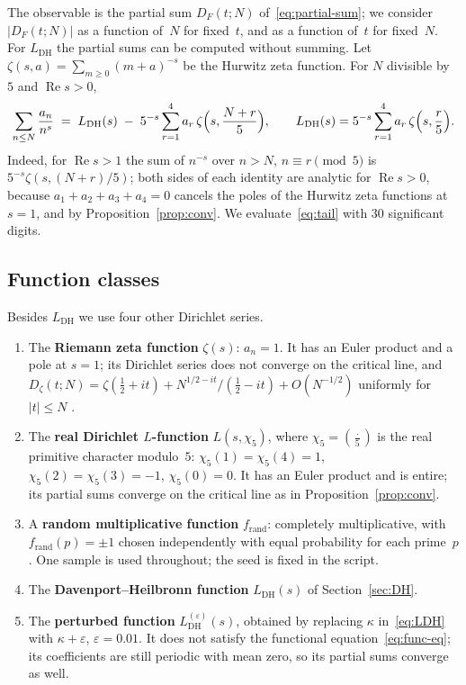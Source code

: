 \documentclass[11pt]{amsart}
\theoremstyle{definition}
\theoremstyle{remark}
\renewcommand{\DH}{\mathrm{DH}}
\newcommand{\abs}[1]{\lvert #1 \rvert}
\newcommand{\re}{\operatorname{Re}}
\begin{document}
The observable is the partial sum $D_F(t;N)$ of~\eqref{eq:partial-sum}; we
consider $\abs{D_F(t;N)}$ as a function of~$N$ for fixed~$t$, and as a
function of~$t$ for fixed~$N$.  For $L_{\DH}$ the partial sums can be
computed without summing.  Let $\zeta(s,a)=\sum_{m\ge0}(m+a)^{-s}$ be the
Hurwitz zeta function.  For $N$ divisible by~$5$ and $\re s>0$,
\begin{equation}\label{eq:tail}
  \sum_{n\le N}\frac{a_n}{n^{s}}
  \;=\; L_{\DH}(s)\;-\;5^{-s}\sum_{r=1}^{4}a_r\,
  \zeta\Bigl(s,\frac{N+r}{5}\Bigr),
  \qquad
  L_{\DH}(s)=5^{-s}\sum_{r=1}^{4}a_r\,\zeta\Bigl(s,\frac r5\Bigr).
\end{equation}
Indeed, for $\re s>1$ the sum of $n^{-s}$ over $n>N$, $n\equiv r\pmod5$
is $5^{-s}\zeta(s,(N+r)/5)$; both sides of each identity are analytic for
$\re s>0$, because $a_1+a_2+a_3+a_4=0$ cancels the poles of the Hurwitz
zeta functions at $s=1$, and by Proposition~\ref{prop:conv}.  We
evaluate~\eqref{eq:tail} with $30$ significant digits.

\subsection{Function classes}

Besides $L_{\DH}$ we use four other Dirichlet series.

\begin{enumerate}
\item The \textbf{Riemann zeta function} $\zeta(s)$: $a_n = 1$.  It has an
  Euler product and a pole at $s=1$; its Dirichlet series does not
  converge on the critical line, and
  $D_\zeta(t;N)=\zeta(\tfrac12+it)+N^{1/2-it}/(\tfrac12-it)+O(N^{-1/2})$
  uniformly for $\abs t\le N$ \cite[Theorem~4.11]{Titchmarsh1986}.

\item The \textbf{real Dirichlet $L$-function} $L(s, \chi_5)$, where
  $\chi_5=(\tfrac{\cdot}{5})$ is the real primitive character modulo~$5$:
  $\chi_5(1) = \chi_5(4) = 1$, $\chi_5(2) = \chi_5(3) = -1$,
  $\chi_5(0) = 0$.  It has an Euler product and is entire; its partial
  sums converge on the critical line as in Proposition~\ref{prop:conv}.

\item A \textbf{random multiplicative function} $f_{\mathrm{rand}}$:
  completely multiplicative, with $f_{\mathrm{rand}}(p)=\pm1$ chosen
  independently with equal probability for each prime~$p$.  One sample is
  used throughout; the seed is fixed in the script.

\item The \textbf{Davenport--Heilbronn function} $L_{\DH}(s)$ of
  Section~\ref{sec:DH}.

\item The \textbf{perturbed function} $L_{\DH}^{(\varepsilon)}(s)$,
  obtained by replacing $\kappa$ in~\eqref{eq:LDH} with
  $\kappa + \varepsilon$, $\varepsilon=0.01$.  It does not satisfy the
  functional equation~\eqref{eq:func-eq}; its coefficients are still
  periodic with mean zero, so its partial sums converge as well.
\end{enumerate}
\end{document}
